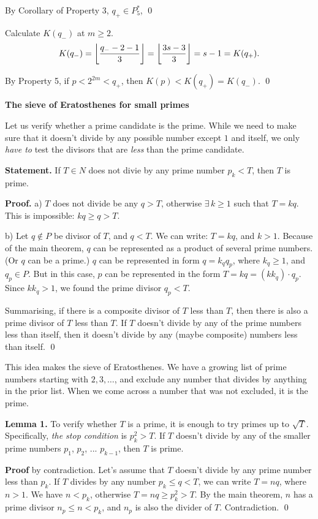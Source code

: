 By Corollary of Property 3, $q_+ \in P_5^*$, \qed

Calculate $K(q_-)$ at $m \ge 2$.
$$
K(q_-) = \left\lfloor { q_- - 2 - 1 \over 3} \right\rfloor = \left\lfloor { 3s - 3 \over 3} \right\rfloor = s - 1 = K(q_+).
$$

By Property 5, if $p < 2^{2m} < q_+$, then $K(p) < K(q_+) = K(q_-)$. \qed

\topicskip
{\bf The sieve of Eratosthenes for small primes}
\bigvskip

Let us verify whether a prime candidate is the prime. While we need to make sure that it doesn't divide by
any possible number except $1$ and itself, we only {\it have to\/} test the divisors that are {\it less\/}
than the prime candidate. 

{\bf Statement.\/} If $T \in N$ does not divie by any prime number $p_k < T$, then $T$ is prime.

{\bf Proof.\/} a) $T$ does not divide be any $q>T$, otherwise $\exists \, k \ge 1$ such that $T=kq$.
This is impossible: $kq \ge q > T$.

b) Let $q \notin P$ be divisor of $T$, and $q<T$. We can write: $T = k q$, and $k > 1$.
Because of the main theorem, $q$ can be represented
as a product of several prime numbers. (Or $q$ can be a prime.) $q$ can be represented in form $q = k_q q_p$,
where $k_q \ge 1$, and $q_p \in P$. But in this case, $p$ can be represented in the form
$T = k q = (k k_q) \cdot q_p$. Since $k k_q > 1$, we found the prime divisor $q_p < T$.

Summarising, if there is a composite divisor of $T$ less than $T$, then there is also a prime divisor of $T$
less than $T$. If $T$ doesn't divide by any of the prime numbers less than itself, then it doesn't
divide by any (maybe composite) numbers less than itself. \qed

This idea makes the sieve of Eratosthenes. We have a growing list of prime numbers starting with $2, 3, \dots$,
and exclude any number that divides by anything in the prior list. When we come across a number that
was not excluded, it is the prime.

\smallvskip

{\bf Lemma 1.} To verify whether $T$ is a prime, it is enough to try primes up to $\sqrt{T}$.
Specifically, {\it the stop condition\/} is $p_k^2>T$. If $T$ doesn't divide by any of the smaller
prime numbers $p_1$, $p_2$, ... $p_{k-1}$, then $T$ is prime.

{\bf Proof\/} by contradiction. Let's assume that $T$ doesn't divide by any prime number less than $p_k$.
If $T$ divides by any number $p_k \le q < T$, we can write $T=nq$, where
$n>1$. We have $n<p_k$, otherwise $T = nq \ge p_k^2 > T$. By the main theorem, $n$ has
a prime divisor $n_p \le n < p_k$, and $n_p$ is also the divider of $T$. Contradiction. \qed

